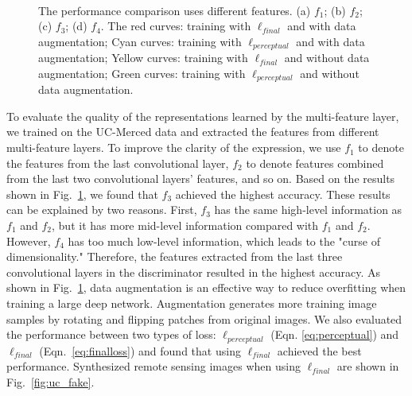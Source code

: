 \documentclass[journal]{IEEEtran}
\begin{document}
\begin{figure}[t]
	\centering
	\\
	\vspace{-2mm}
	\caption{The performance comparison uses different features. (a) $f_1$; (b) $f_2$; (c) $f_3$;
		(d) $f_4$. 
		The red curves: training with $\ell_{final}$ and with data augmentation;
		Cyan curves: training with $\ell_{perceptual}$ and with data augmentation;
		Yellow curves: training with $\ell_{final}$ and without data augmentation;
		Green curves: training with $\ell_{perceptual}$ and without data augmentation. }
	\vspace{-2mm}
	\label{fig:compare_acc}
\end{figure}




To evaluate the quality of the representations learned by the multi-feature layer, we trained on the UC-Merced data and extracted the features from different multi-feature layers.
To improve the clarity of the expression, we use $f_1$ to denote the features from the last convolutional layer, $f_2$ to denote features combined from the last two convolutional layers' features, and so on. Based on the results shown in Fig.~\ref{fig:compare_acc}, we found that $f_3$ achieved the highest accuracy. These results can be explained by two reasons. First, $f_3$ has the same high-level information as $f_1$ and $f_2$, but it has more mid-level information compared with $f_1$ and $f_2$. However, $f_4$ has too much low-level information, which leads to the "curse of dimensionality." Therefore, the features extracted from the last three convolutional layers in the discriminator resulted in the highest accuracy. As shown in Fig.~\ref{fig:compare_acc}, data augmentation is an effective way to reduce overfitting when training a large deep network. Augmentation generates more training image samples by rotating and flipping patches from original images. We also evaluated the performance between two types of loss: $\ell_{perceptual}$ (Eqn. \ref{eq:perceptual}) and $\ell_{final}$ (Eqn.~\ref{eq:finalloss}) and found that using $\ell_{final}$ achieved the best performance. Synthesized remote sensing images when using $\ell_{final}$ are shown in Fig.~\ref{fig:uc_fake}.
\end{document}

